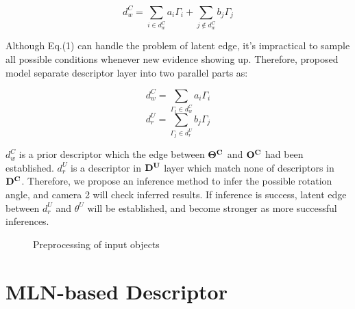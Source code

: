 \documentclass[journal]{IEEEtran}
\begin{document}
\begin{equation}
d^C_w=\sum_{i\in{d^C_w}}a_{i}\Gamma_{i}+\sum_{j\notin{d^C_w}}b_{j}\Gamma_{j}
\end{equation}

Although Eq.(1) can handle the problem of latent edge, it's impractical to sample all possible conditions whenever new evidence showing up. Therefore, proposed model separate descriptor layer into two parallel parts as: 

\begin{equation}
d^C_w=\sum_{\Gamma_{i}\in{d^C_w}}a_{i}\Gamma_{i}
\end{equation}
\begin{equation}
d^U_r=\sum_{\Gamma_{j}\in{d^U_r}}b_{j}\Gamma_{j}
\end{equation}

$d^C_w$ is a prior descriptor which the edge between $\bf{\Theta^{C}}$ and $\bf{O^C}$ had been established. $d^U_r$ is a descriptor in $\bf{D^U}$ layer which match none of descriptors in $\bf{D^C}$. Therefore, we propose an inference method to infer the possible rotation angle, and camera 2 will check inferred results. If inference is success, latent edge between $d^U_r$ and $\theta^{U}$ will be established, and become stronger as more successful inferences.

\begin{figure}[!t]
\begin{center}
\caption{Preprocessing of input objects}\label{test}
\end{center}
\end{figure}


\section{MLN-based Descriptor}
\end{document}
